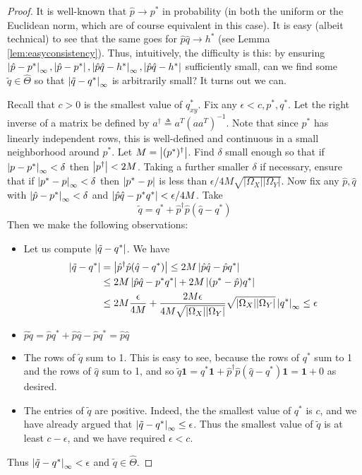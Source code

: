 \begin{proof}
It is well-known that $\hat p\rightarrow p^*$ in probability (in both the uniform or the Euclidean norm, which are of course equivalent in this case).  It is easy (albeit technical) to see that the same goes for $\hat p\hat q\rightarrow h^*$ (see Lemma \ref{lem:easyconsistency}).  Thus, intuitively, the difficulty is this: by ensuring $\left|\hat p - p^*\right|_\infty,\left|\hat p - p^*\right|,\left|\hat p\hat q - h^*\right|_\infty,\left|\hat p\hat q - h^*\right|$ sufficiently small, can we find some $\tilde q\in \hat \Theta$ so that $\left|\tilde q - q^*\right|_\infty$ is arbitrarily small?  It turns out we can.

Recall that $c>0$ is the smallest value of $q^*_{xy}$.  Fix any $\epsilon<c, p^*,q^*$.  Let the right inverse of a matrix be defined by $a^\dagger \triangleq a^T (aa^T)^{-1}$.  Note that since $p^*$ has linearly independent rows, this is well-defined and continuous in a small neighborhood around $p^*$.  Let $M=\left|(p^*)^\dagger\right|$.  Find $\delta$ small enough so that if $\left|p-p^*\right|_\infty<\delta$ then $\left|p^\dagger\right|<2M$.  Taking a further smaller $\delta$ if necessary, ensure that if $\left|p^*-p\right|_\infty<\delta$ then $\left|p^*-p\right|$ is less than $\epsilon / 4M\sqrt{|\Omega_X||\Omega_Y|}$.  
Now fix any $\hat p,\hat q$ with $\left|\hat p-p^*\right|_\infty<\delta$ and $\left|\hat p \hat q - p^*q^*\right|<\epsilon/4M$.  Take
\[
\tilde q = q^* + \hat p^\dagger \hat p (\hat q - q^*)
\] 
Then we make the following observations:
\begin{itemize}
  \item Let us compute $\left|\tilde q -q^*\right|$. We have
   \begin{align*}
   \left|\tilde q -q^*\right| &= \left|\hat p^\dagger \hat p (\hat q - q^*)\right| \leq 2M \left|\hat p \hat q - \hat p q^*\right| \\
        &\leq 2M \left|\hat p \hat q - p^* q^*\right| + 2M\left|(p^* - \hat p)q^*\right|\\
        &\leq 2M \frac{\epsilon}{4M} + \frac{2M\epsilon}{4M\sqrt{|\Omega_X||\Omega_Y|}}\sqrt{|\Omega_X||\Omega_Y|}\left|q^*\right|_\infty \leq \epsilon 
   \end{align*}
  \item $\hat p \tilde q = \hat p q^* + \hat p \hat q - \hat p q^* = \hat p \hat q$
  \item The rows of $\tilde q$ sum to 1.  This is easy to see, because the rows of $q^*$ sum to 1 and the rows of $\hat q$ sum to 1, and so $\tilde q \mathbf{1} = q^* \mathbf{1} + \hat p^\dagger \hat p (\hat q - q^*) \mathbf{1} = \mathbf{1} + 0$ as desired.
  \item The entries of $\tilde q$ are positive.   Indeed, the the smallest value of $q^*$ is $c$, and we have already argued that $\left|\tilde q - q^*\right|_\infty\leq \epsilon$.  Thus the smallest value of $\tilde q$ is at least $c-\epsilon$, and we have required $\epsilon<c$.  
\end{itemize}
Thus $\left|\tilde q - q^*\right|_\infty<\epsilon$ and $\tilde q \in \hat \Theta$.  


\end{proof}
